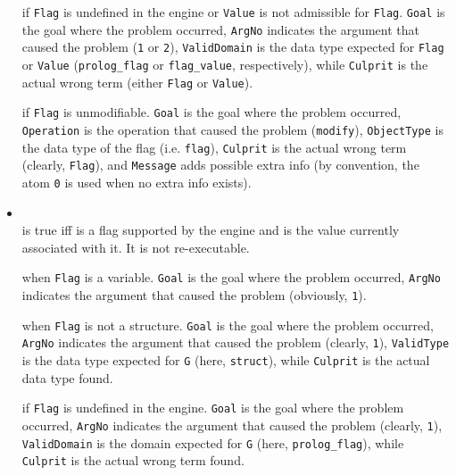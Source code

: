 \begin{itemize}
     if \texttt{Flag} is undefined in the engine or \texttt{Value} is not admissible for \texttt{Flag}. \texttt{Goal} is the goal where the problem occurred, \texttt{ArgNo} indicates the argument that caused the problem (\texttt{1} or \texttt{2}), \texttt{ValidDomain} is the data type expected for \texttt{Flag} or \texttt{Value} (\texttt{prolog\_flag} or \texttt{flag\_value}, respectively), while \texttt{Culprit} is the actual wrong term (either \texttt{Flag} or \texttt{Value}).

     if \texttt{Flag} is unmodifiable. \texttt{Goal} is the goal where the problem occurred, \texttt{Operation} is the operation that caused the problem (\texttt{modify}), \texttt{ObjectType} is the data type of the flag (i.e. \texttt{flag}), \texttt{Culprit} is the actual wrong term (clearly, \texttt{Flag}), and \texttt{Message} adds possible extra info (by convention, the atom \texttt{0} is used when no extra info exists).

\item {}\\
    \noindent{} is true iff  is a flag supported by the engine and  is the value currently associated with it. It is not re-executable.


     when \texttt{Flag} is a variable. \texttt{Goal} is the goal where the problem occurred, \texttt{ArgNo} indicates the argument that caused the problem (obviously, \texttt{1}).

     when \texttt{Flag} is not a structure. \texttt{Goal} is the goal where the problem occurred, \texttt{ArgNo} indicates the argument that caused the problem (clearly, \texttt{1}), \texttt{ValidType} is the data type expected for \texttt{G} (here, \texttt{struct}), while \texttt{Culprit} is the actual data type found.

     if \texttt{Flag} is undefined in the engine. \texttt{Goal} is the goal where the problem occurred, \texttt{ArgNo} indicates the argument that caused the problem (clearly, \texttt{1}), \texttt{ValidDomain} is the domain expected for \texttt{G} (here, \texttt{prolog\_flag}), while \texttt{Culprit} is the actual wrong term found.

\end{itemize}

